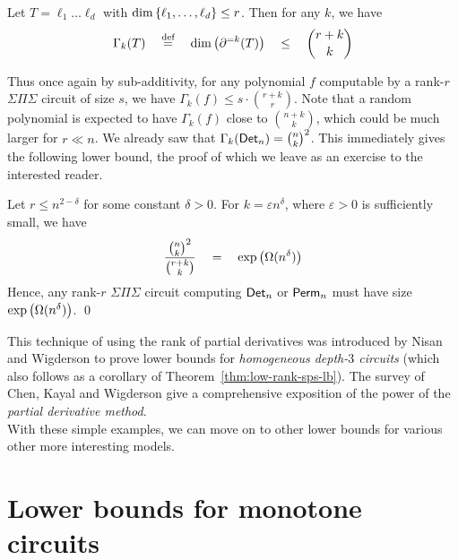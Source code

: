 \documentclass{birkjour}
\newcommand{\spaced}[1]{\quad#1\quad}
\renewcommand{\epsilon}{\varepsilon}
\begin{document}
\begin{observation}
Let $T = \ell_1\dots \ell_d$ with $\dim\left\{\ell_1,\dots, \ell_d\right\}\leq r$. Then for any $k$, we have
$$
\Gamma_k(T) \spaced{\eqdef}\dim\inparen{\partial^{=k}(T)} \spaced{\leq} \binom{r+k}{k}
$$
\end{observation}

Thus once again by sub-additivity, for any polynomial $f$ computable by a rank-$r$ $\Sigma\Pi\Sigma$ circuit of size $s$, we have $\Gamma_k(f) \leq s\cdot \binom{r+k}{r}$. Note that a random polynomial is expected to have $\Gamma_k(f)$ close to $\binom{n+k}{k}$, which could be much larger for $r\ll n$. We already saw that $\Gamma_k(\mathsf{Det}_n) = \binom{n}{k}^2$. This immediately gives the following lower bound, the proof of which we leave as an exercise to the interested reader. 

\begin{theorem}\label{thm:low-rank-sps-lb}
Let $r \leq n^{2-\delta}$ for some constant $\delta > 0$. For $k = \epsilon n^{\delta}$, where $\epsilon > 0$ is sufficiently small, we have
$$
\frac{\binom{n}{k}^2}{\binom{r+k}{k}} \quad=\quad \exp\left(\Omega(n^{\delta})\right)
$$
Hence, any rank-$r$ $\Sigma\Pi\Sigma$ circuit computing $\mathsf{Det}_n$ or $\mathsf{Perm}_n$ must have size $\exp\left(\Omega(n^\delta)\right)$. \qed
\end{theorem}


This technique of using the rank of partial derivatives was introduced by Nisan and Wigderson \cite{nw1997} to prove lower bounds for \emph{homogeneous depth-$3$ circuits} (which also follows as a corollary of Theorem~\ref{thm:low-rank-sps-lb}). The survey of Chen, Kayal and Wigderson \cite{ckw11} give a comprehensive exposition of the power of the \emph{partial derivative method}. \\



With these simple examples, we can move on to other lower bounds for various other more interesting models. 





\section{Lower bounds for monotone circuits}
\end{document}
